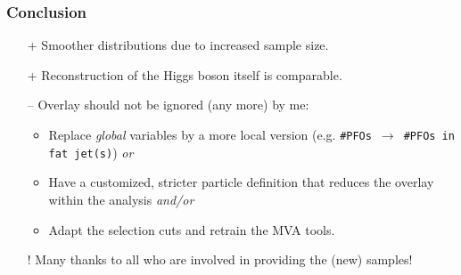 

\begin{frame}
  \frametitle{Conclusion}
  \begin{itemize}
    \item[+] Smoother distributions due to increased sample size.
    \item[+] Reconstruction of the Higgs boson itself is comparable.
    \item[--] Overlay should not be ignored (any more) by me:
    \begin{itemize}
        \item Replace \textit{global} variables by a more local version
            (e.g. \texttt{\#PFOs}~$\rightarrow$~\texttt{\#PFOs in fat jet(s)}) \textit{or}
        \item Have a customized, stricter particle definition that reduces the
            overlay within the analysis \textit{and/or}
        \item Adapt the selection cuts and retrain the MVA tools.
    \end{itemize}
    \item[!] Many thanks to all who are involved in providing the (new) samples!
  \end{itemize}
  \end{frame}